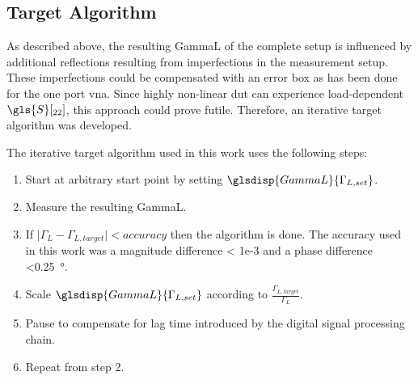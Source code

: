 \documentclass[12pt,a4paper,parskip=full,abstract=true,BCOR=12mm,twoside,open=right]{scrreprt}
\providecommand{\abs}[1]{\lvert#1\rvert}
\begin{document}

\subsection{Target Algorithm}
\label{sec:target}

As described above, the resulting \gls{GammaL} of the complete setup is
influenced by additional reflections resulting from imperfections in the
measurement setup. These imperfections could be compensated with an error
box as has been done for the one port \gls{vna}. Since highly non-linear \gls{dut}
can experience load-dependent $\gls{S}[_{22}]$, this approach could prove
futile. Therefore, an iterative target algorithm was developed.

The iterative target algorithm used in this work uses the following steps:
\begin{enumerate}
    \item Start at arbitrary start point by setting $\glsdisp{GammaL}{\Gamma_{L,set}}$.
    \item Measure the resulting \gls{GammaL}.
    \item If $\abs{\Gamma_L - \Gamma_{L,target}} < accuracy$ then the algorithm is done. The
        accuracy used in this work was a magnitude difference \num{< 1e-3} and a phase difference \SI{<0.25}{\degree}.
    \item Scale $\glsdisp{GammaL}{\Gamma_{L,set}}$ according to $\frac{\Gamma_{L,target}}{\Gamma_L}$.
    \item Pause to compensate for lag time introduced by the digital signal processing chain.
    \item Repeat from step 2.
\end{enumerate}
\end{document}
